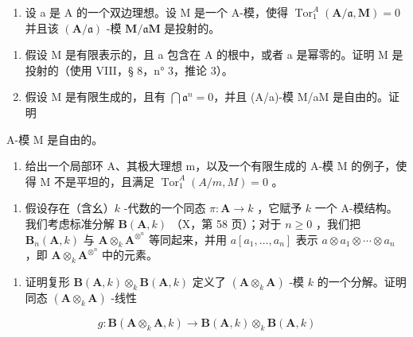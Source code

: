 \begin{enumerate}
\def\labelenumi{\arabic{enumi})}
\setcounter{enumi}{3}
\tightlist
\item
  设 a 是 A 的一个双边理想。设 M 是一个 A-模，使得 \(\operatorname{Tor}_1^A (\mathbf{A} / \mathfrak{a},\mathbf{M}) = 0\) 并且该 \((\mathbf{A} / \mathfrak{a})\) -模 \(\mathbf{M} / \mathfrak{a}\mathbf{M}\) 是投射的。
\end{enumerate}

\begin{enumerate}
\def\labelenumi{\alph{enumi})}
\item
  假设 M 是有限表示的，且 a 包含在 A 的根中，或者 a 是幂零的。证明 M 是投射的（使用 VIII，§ 8，n° 3，推论 3）。
\item
  假设 M 是有限生成的，且有 \(\bigcap \mathfrak{a}^n = 0\)，并且 (A/a)-模 M/aM 是自由的。证明
\end{enumerate}

A-模 M 是自由的。

\begin{enumerate}
\def\labelenumi{\alph{enumi})}
\setcounter{enumi}{2}
\tightlist
\item
  给出一个局部环 A、其极大理想 m，以及一个有限生成的 A-模 M 的例子，使得 M 不是平坦的，且满足 \(\operatorname{Tor}_{1}^{A}(A/m, M) = 0\) 。
\end{enumerate}

\begin{enumerate}
\def\labelenumi{\arabic{enumi})}
\setcounter{enumi}{4}
\tightlist
\item
  假设存在（含幺）\(k\) -代数的一个同态 \(\pi: \mathbf{A} \to k\) ，它赋予 \(k\) 一个 A-模结构。我们考虑标准分解 \(\mathbf{B}(\mathbf{A}, k)\) （X，第 58 页）；对于 \(n \geqslant 0\) ，我们把 \(\mathbf{B}_n(\mathbf{A}, k)\) 与 \(\mathbf{A} \otimes_k \mathbf{A}^{\otimes^n}\) 等同起来，并用 \(a[a_1, ..., a_n]\) 表示 \(a \otimes a_1 \otimes \cdots \otimes a_n\) ，即 \(\mathbf{A} \otimes_k \mathbf{A}^{\otimes^n}\) 中的元素。
\end{enumerate}

\begin{enumerate}
\def\labelenumi{\alph{enumi})}
\tightlist
\item
  证明复形 \(\mathbf{B}(\mathbf{A}, k) \otimes_k \mathbf{B}(\mathbf{A}, k)\) 定义了 \((\mathbf{A} \otimes_k \mathbf{A})\) -模 \(k\) 的一个分解。证明同态 \((\mathbf{A} \otimes_k \mathbf{A})\) -线性
\end{enumerate}

\[
g: \mathbf {B} (\mathbf {A} \otimes_ {k} \mathbf {A}, k) \rightarrow \mathbf {B} (\mathbf {A}, k) \otimes_ {k} \mathbf {B} (\mathbf {A}, k)
\]

